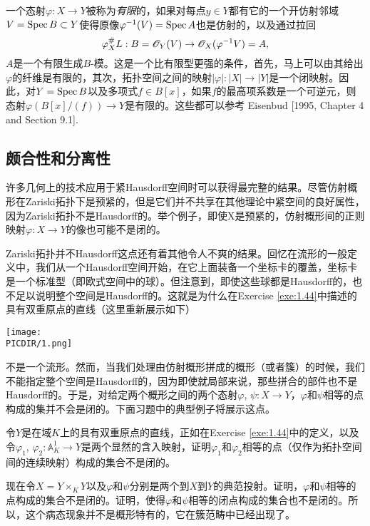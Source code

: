 一个态射$\varphi:X\to Y$被称为\textit{有限}的，如果对每点$y\in Y$都有它的一个开仿射邻域$V=\operatorname{Spec} B\subset Y$使得原像$\varphi^{-1}(V)=\operatorname{Spec} A$也是仿射的，以及通过拉回
\[
	\varphi_X^\#L: B =\mathscr{O}_Y(V)\to \mathscr{O}_X(\varphi^{-1}V)=A,
\]
$A$是一个有限生成$B$-模。这是一个比有限型更强的条件，首先，马上可以由其给出$\varphi$的纤维是有限的，其次，拓扑空间之间的映射$|\varphi|:|X|\to |Y|$是一个闭映射。因此，对$Y=\operatorname{Spec} B$以及多项式$f\in B[x]$，如果$f$的最高项系数是一个可逆元，则态射$\varphi(B[x]/(f))\to Y$是有限的。这些都可以参考 Eisenbud [1995, Chapter 4 and Section 9.1].

\subsection{颇合性和分离性}

许多几何上的技术应用于紧Hausdorff空间时可以获得最完整的结果。尽管仿射概形在Zariski拓扑下是预紧的，但是它们并不共享在其他理论中紧空间的良好属性，因为Zariski拓扑不是Hausdorff的。举个例子，即使X是预紧的，仿射概形间的正则映射$\varphi:X\to Y$的像也可能不是闭的。

Zariski拓扑并不Hausdorff这点还有着其他令人不爽的结果。回忆在流形的一般定义中，我们从一个Hausdorff空间开始，在它上面装备一个坐标卡的覆盖，坐标卡是一个标准型（即欧式空间中的球）。但注意到，即使这些球都是Hausdorff的，也不足以说明整个空间是Hausdorff的。这就是为什么在Exercise \ref{exe:1.44}中描述的具有双重原点的直线（这里重新展示如下）

\begin{center}\texttt{[image: \\PICDIR/1.png]}\end{center}

\vspace{-0.4em}\noindent 不是一个流形。然而，当我们处理由仿射概形拼成的概形（或者簇）的时候，我们不能指定整个空间是Hausdorff的，因为即使就局部来说，那些拼合的部件也不是Hausdorff的。于是，对给定两个概形之间的两个态射$\varphi$, $\psi:X\to Y$，$\varphi$和$\psi$相等的点构成的集并不会是闭的。下面习题中的典型例子将展示这点。

\begin{exe}
\begin{compactenum}[(a)]
\item 令$Y$是在域$K$上的具有双重原点的直线，正如在Exercise \ref{exe:1.44}中的定义，以及令$\varphi_1$, $\varphi_2:\mathbb{A}_K^1\to Y$是两个显然的含入映射，证明$\varphi_1$和$\varphi_2$相等的点（仅作为拓扑空间间的连续映射）构成的集合不是闭的。
\item 现在令$X=Y\times_K Y$以及$\varphi$和$\psi$分别是两个到$X$到$Y$的典范投射。证明，$\varphi$和$\psi$相等的点构成的集合不是闭的。证明，使得$\varphi$和$\psi$相等的闭点构成的集合也不是闭的。所以，这个病态现象并不是概形特有的，它在簇范畴中已经出现了。
\end{compactenum}
\end{exe}

